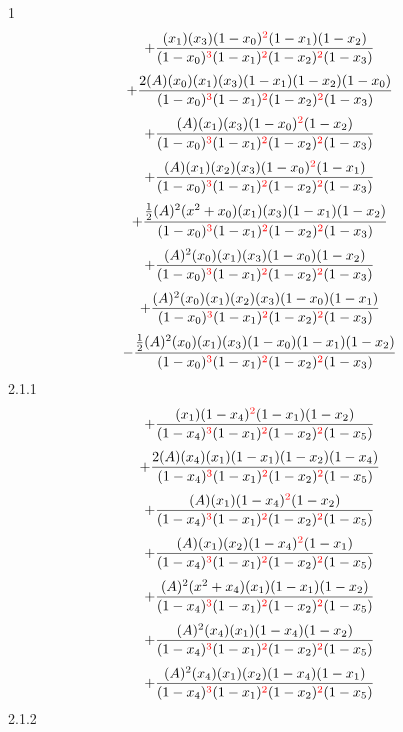 \documentclass{article}
\begin{document}
            
1
\[+\frac{(x_1)(x_3)(1-x_0)^{\textcolor{red}{2}}(1-x_1)(1-x_2)}{(1-x_0)^{\textcolor{red}{3}}(1-x_1)^{\textcolor{red}{2}}(1-x_2)^{\textcolor{red}{2}}(1-x_3)}\]\[+\frac{2(A)(x_0)(x_1)(x_3)(1-x_1)(1-x_2)(1-x_0)}{(1-x_0)^{\textcolor{red}{3}}(1-x_1)^{\textcolor{red}{2}}(1-x_2)^{\textcolor{red}{2}}(1-x_3)}\]\[+\frac{(A)(x_1)(x_3)(1-x_0)^{\textcolor{red}{2}}(1-x_2)}{(1-x_0)^{\textcolor{red}{3}}(1-x_1)^{\textcolor{red}{2}}(1-x_2)^{\textcolor{red}{2}}(1-x_3)}\]\[+\frac{(A)(x_1)(x_2)(x_3)(1-x_0)^{\textcolor{red}{2}}(1-x_1)}{(1-x_0)^{\textcolor{red}{3}}(1-x_1)^{\textcolor{red}{2}}(1-x_2)^{\textcolor{red}{2}}(1-x_3)}\]\[+\frac{\frac{1}{2}(A)^{2}(x^{2}+x_0)(x_1)(x_3)(1-x_1)(1-x_2)}{(1-x_0)^{\textcolor{red}{3}}(1-x_1)^{\textcolor{red}{2}}(1-x_2)^{\textcolor{red}{2}}(1-x_3)}\]\[+\frac{(A)^{2}(x_0)(x_1)(x_3)(1-x_0)(1-x_2)}{(1-x_0)^{\textcolor{red}{3}}(1-x_1)^{\textcolor{red}{2}}(1-x_2)^{\textcolor{red}{2}}(1-x_3)}\]\[+\frac{(A)^{2}(x_0)(x_1)(x_2)(x_3)(1-x_0)(1-x_1)}{(1-x_0)^{\textcolor{red}{3}}(1-x_1)^{\textcolor{red}{2}}(1-x_2)^{\textcolor{red}{2}}(1-x_3)}\]\[-\frac{\frac{1}{2}(A)^{2}(x_0)(x_1)(x_3)(1-x_0)(1-x_1)(1-x_2)}{(1-x_0)^{\textcolor{red}{3}}(1-x_1)^{\textcolor{red}{2}}(1-x_2)^{\textcolor{red}{2}}(1-x_3)}\]
2.1.1
\[+\frac{(x_1)(1-x_4)^{\textcolor{red}{2}}(1-x_1)(1-x_2)}{(1-x_4)^{\textcolor{red}{3}}(1-x_1)^{\textcolor{red}{2}}(1-x_2)^{\textcolor{red}{2}}(1-x_5)}\]\[+\frac{2(A)(x_4)(x_1)(1-x_1)(1-x_2)(1-x_4)}{(1-x_4)^{\textcolor{red}{3}}(1-x_1)^{\textcolor{red}{2}}(1-x_2)^{\textcolor{red}{2}}(1-x_5)}\]\[+\frac{(A)(x_1)(1-x_4)^{\textcolor{red}{2}}(1-x_2)}{(1-x_4)^{\textcolor{red}{3}}(1-x_1)^{\textcolor{red}{2}}(1-x_2)^{\textcolor{red}{2}}(1-x_5)}\]\[+\frac{(A)(x_1)(x_2)(1-x_4)^{\textcolor{red}{2}}(1-x_1)}{(1-x_4)^{\textcolor{red}{3}}(1-x_1)^{\textcolor{red}{2}}(1-x_2)^{\textcolor{red}{2}}(1-x_5)}\]\[+\frac{(A)^{2}(x^{2}+x_4)(x_1)(1-x_1)(1-x_2)}{(1-x_4)^{\textcolor{red}{3}}(1-x_1)^{\textcolor{red}{2}}(1-x_2)^{\textcolor{red}{2}}(1-x_5)}\]\[+\frac{(A)^{2}(x_4)(x_1)(1-x_4)(1-x_2)}{(1-x_4)^{\textcolor{red}{3}}(1-x_1)^{\textcolor{red}{2}}(1-x_2)^{\textcolor{red}{2}}(1-x_5)}\]\[+\frac{(A)^{2}(x_4)(x_1)(x_2)(1-x_4)(1-x_1)}{(1-x_4)^{\textcolor{red}{3}}(1-x_1)^{\textcolor{red}{2}}(1-x_2)^{\textcolor{red}{2}}(1-x_5)}\]
2.1.2
\end{document}

